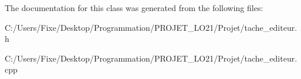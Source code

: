The documentation for this class was generated from the following files\+:\begin{DoxyCompactItemize}
\item 
C\+:/\+Users/\+Fixe/\+Desktop/\+Programmation/\+P\+R\+O\+J\+E\+T\+\_\+\+L\+O21/\+Projet/tache\+\_\+editeur.\+h\item 
C\+:/\+Users/\+Fixe/\+Desktop/\+Programmation/\+P\+R\+O\+J\+E\+T\+\_\+\+L\+O21/\+Projet/tache\+\_\+editeur.\+cpp\end{DoxyCompactItemize}
